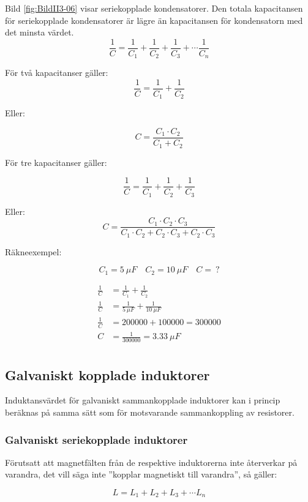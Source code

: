 Bild \ref{fig:BildII3-06} visar seriekopplade kondensatorer.
Den totala kapacitansen för seriekopplade kondensatorer är lägre än kapacitansen
för kondensatorn med det minsta värdet.
\[
\frac{1}{C} = \frac{1}{C_1} + \frac{1}{C_2} + \frac{1}{C_3} + \cdots
\frac{1}{C_n}
\]

För två kapacitanser gäller:
\[ \frac{1}{C} = \frac{1}{C_1} + \frac{1}{C_2} \]

Eller:

\[  C = \frac{C_1 \cdot C_2}{C_1 + C_2} \]

För tre kapacitanser gäller:

\[  \frac{1}{C} = \frac{1}{C_1} + \frac{1}{C_2} + \frac{1}{C_3} \]

Eller:
\[ C = \frac{C_1 \cdot C_2 \cdot C_3}
   {C_1 \cdot C_2 + C_2 \cdot C_3 + C_2 \cdot C_3} \]

\noindent Räkneexempel:

\[ C_1 = 5\ \mu F \quad C_2 = 10\ \mu F \quad C =\ ? \]

\begin{align*}
  \frac{1}{C} &= \frac{1}{C_1} + \frac{1}{C_2} \\
  \frac{1}{C} &= \frac{1}{\SI{5}{\mu F}} + \frac{1}{\SI{10}{\mu F}}\\
  \frac{1}{C} &= \num{200000} + \num{100000} = \num{300000}\\
  C &= \frac{1}{\num{300000}} = \SI{3,33}{\mu F} \\
\end{align*}

\subsection{Galvaniskt kopplade induktorer}

Induktansvärdet för galvaniskt sammankopplade induktorer kan i princip
beräknas på samma sätt som för motsvarande sammankoppling av resistorer.

\subsubsection{Galvaniskt seriekopplade induktorer}

Förutsatt att magnetfälten från de respektive induktorerna inte återverkar på
varandra, det vill säga inte ''kopplar magnetiskt till varandra'', så gäller:

\[L = L_1 + L_2 + L_3 + \cdots L_n\]

